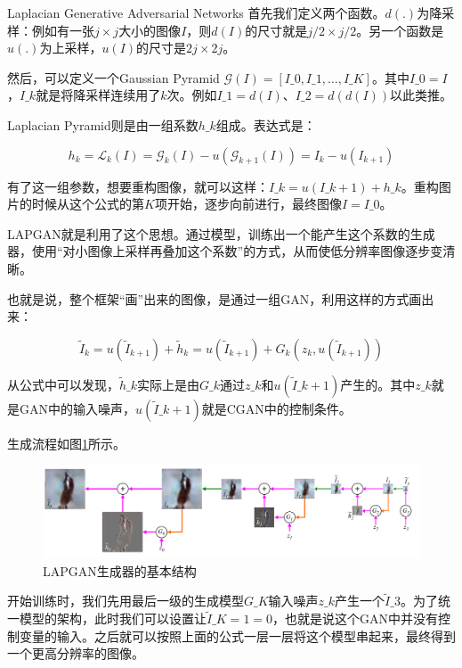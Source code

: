 \documentclass{ctexart}
\begin{document}
\begin{section}{Laplacian Generative Adversarial Networks}
		首先我们定义两个函数。$d(.)$为降采样：例如有一张$j\times j$大小的图像$I$，则$d(I)$的尺寸就是$j/2\times j/2$。另一个函数是$u(.)$为上采样，$u(I)$的尺寸是$2j\times 2j$。
		
		然后，可以定义一个Gaussian Pyramid $\mathcal{G}(I)=\left[I\_0,I\_1,\dots,I\_K\right]$。其中$I\_0=I$，$I\_k$就是将降采样连续用了$k$次。例如$I\_1=d(I)$、$I\_2=d(d(I))$以此类推。
		
		Laplacian Pyramid则是由一组系数$h\_k$组成。表达式是：
		
		\begin{equation}
			h_k=\mathcal{L}_k(I)=\mathcal{G}_k(I)-u(\mathcal{G}_{k+1}(I))=I_k-u(I_{k+1})
		\end{equation}
		
		有了这一组参数，想要重构图像，就可以这样：$I\_k=u(I\_{k+1})+h\_k$。重构图片的时候从这个公式的第$K$项开始，逐步向前进行，最终图像$I=I\_0$。
		
		LAPGAN就是利用了这个思想。通过模型，训练出一个能产生这个系数的生成器，使用“对小图像上采样再叠加这个系数”的方式，从而使低分辨率图像逐步变清晰。
		
		也就是说，整个框架“画”出来的图像，是通过一组GAN，利用这样的方式画出来：
		
		\begin{equation}
			\tilde{I}_k=u(\tilde{I}_{k+1})+\tilde{h}_k=u(\tilde{I}_{k+1})+G_k(z_k,u(\tilde{I}_{k+1}))
		\end{equation}
		
		从公式中可以发现，$\tilde{h}\_k$实际上是由$G\_k$通过$z\_k$和$u(\tilde{I}\_{k+1})$产生的。其中$z\_k$就是GAN中的输入噪声，$u({\tilde{I}\_{k+1}})$就是CGAN中的控制条件。
		
		生成流程如图\ref{fig:lapgan-gene-structure}所示。
		
		\begin{figure}
			\centering
			\includegraphics[width=40em]{figures/LAPGAN-generator-structure.png}
			\caption{LAPGAN生成器的基本结构}
			\label{fig:lapgan-gene-structure}
		\end{figure}
	
		开始训练时，我们先用最后一级的生成模型$G\_K$输入噪声$z\_k$产生一个$\tilde{I}\_3$。为了统一模型的架构，此时我们可以设置让$\tilde{I}\_{K=1}=0$，也就是说这个GAN中并没有控制变量的输入。之后就可以按照上面的公式一层一层将这个模型串起来，最终得到一个更高分辨率的图像。
		

\end{section}
\end{document}
